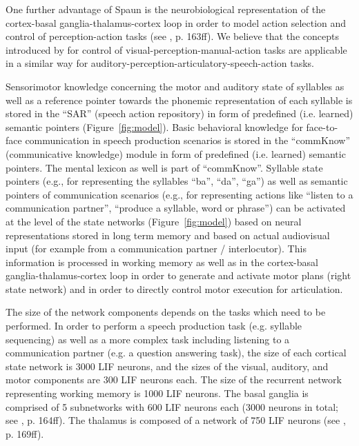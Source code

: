 \documentclass[conference]{IEEEtran}
\begin{document}
One further advantage of Spaun is the neurobiological representation
of the cortex-basal ganglia-thalamus-cortex loop in order to model
action selection and control of perception-action tasks
(see \cite{eliasmith2013}, p. 163ff). We believe that the concepts
introduced by \cite{eliasmith2013} for control of
visual-perception-manual-action tasks are applicable in a similar way
for auditory-perception-articulatory-speech-action tasks.

Sensorimotor knowledge concerning the motor and auditory state of
syllables as well as a reference pointer towards the
phonemic representation of each syllable
is stored in the ``SAR'' (speech action repository) in form of
predefined (i.e. learned) semantic pointers (Figure~\ref{fig:model}).
Basic behavioral knowledge for face-to-face communication in speech
production scenarios is stored in the  ``commKnow'' (communicative knowledge)
module in form of predefined (i.e. learned) semantic pointers.
The mental lexicon as well is part of ``commKnow''.
Syllable state pointers (e.g., for representing the syllables
``ba'', ``da'', ``ga'') as well as semantic pointers of
communication scenarios (e.g., for representing actions like
``listen to a communication partner'', ``produce a syllable, word or
phrase'') can be activated at the level of the state networks
(Figure~\ref{fig:model})
based on neural representations stored in long term memory
and based on actual audiovisual input (for example from a
communication partner / interlocutor).
This information is processed
in working memory as well as in the
cortex-basal ganglia-thalamus-cortex loop in order to generate and
activate motor plans (right state network) and in order to directly
control motor execution for articulation.

The size of the network components depends on the tasks which need to
be performed. In order to perform a speech production task
(e.g. syllable sequencing) as well as a more complex task including listening to
a communication partner (e.g. a question answering task), the size of
each cortical state network is 3000 LIF neurons,
and the sizes of the visual, auditory, and motor components are
300 LIF neurons each. The size of the recurrent network representing
working memory is 1000 LIF neurons. The basal ganglia is comprised of
5 subnetworks with 600 LIF neurons each (3000 neurons in
total; see \cite{eliasmith2013}, p. 164ff). The thalamus is
composed of a network of 750 LIF neurons (see
\cite{eliasmith2013}, p. 169ff).
\end{document}
